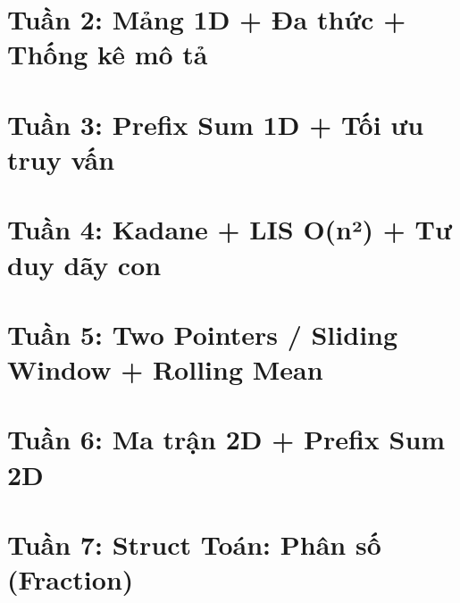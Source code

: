 \documentclass[12pt,a4paper]{report}
\begin{document}
\chapter{Tuần 2: Mảng 1D + Đa thức + Thống kê mô tả}











\chapter{Tuần 3: Prefix Sum 1D + Tối ưu truy vấn}











\chapter{Tuần 4: Kadane + LIS O(n²) + Tư duy dãy con}











\chapter{Tuần 5: Two Pointers / Sliding Window + Rolling Mean}











\chapter{Tuần 6: Ma trận 2D + Prefix Sum 2D}











\chapter{Tuần 7: Struct Toán: Phân số (Fraction)}










\end{document}
